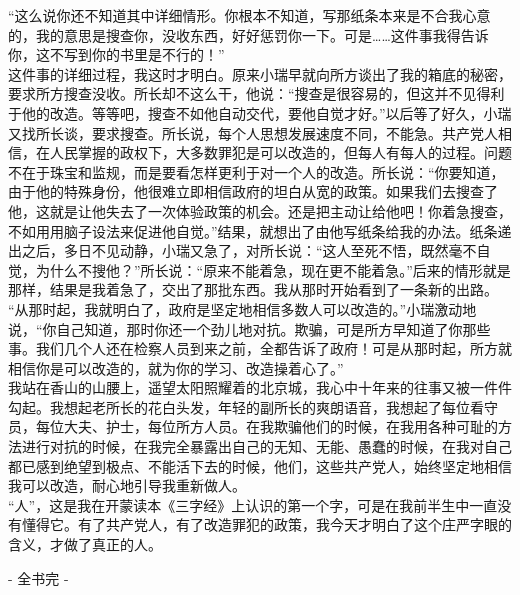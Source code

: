 “这么说你还不知道其中详细情形。你根本不知道，写那纸条本来是不合我心意的，我的意思是搜查你，没收东西，好好惩罚你一下。可是……这件事我得告诉你，这不写到你的书里是不行的！”\\

这件事的详细过程，我这时才明白。原来小瑞早就向所方谈出了我的箱底的秘密，要求所方搜查没收。所长却不这么干，他说：“搜查是很容易的，但这并不见得利于他的改造。等等吧，搜查不如他自动交代，要他自觉才好。”以后等了好久，小瑞又找所长谈，要求搜查。所长说，每个人思想发展速度不同，不能急。共产党人相信，在人民掌握的政权下，大多数罪犯是可以改造的，但每人有每人的过程。问题不在于珠宝和监规，而是要看怎样更利于对一个人的改造。所长说：“你要知道，由于他的特殊身份，他很难立即相信政府的坦白从宽的政策。如果我们去搜查了他，这就是让他失去了一次体验政策的机会。还是把主动让给他吧！你着急搜查，不如用用脑子设法来促进他自觉。”结果，就想出了由他写纸条给我的办法。纸条递出之后，多日不见动静，小瑞又急了，对所长说：“这人至死不悟，既然毫不自觉，为什么不搜他？”所长说：“原来不能着急，现在更不能着急。”后来的情形就是那样，结果是我着急了，交出了那批东西。我从那时开始看到了一条新的出路。\\

“从那时起，我就明白了，政府是坚定地相信多数人可以改造的。”小瑞激动地说，“你自己知道，那时你还一个劲儿地对抗。欺骗，可是所方早知道了你那些事。我们几个人还在检察人员到来之前，全都告诉了政府！可是从那时起，所方就相信你是可以改造的，就为你的学习、改造操着心了。”\\

我站在香山的山腰上，遥望太阳照耀着的北京城，我心中十年来的往事又被一件件勾起。我想起老所长的花白头发，年轻的副所长的爽朗语音，我想起了每位看守员，每位大夫、护士，每位所方人员。在我欺骗他们的时候，在我用各种可耻的方法进行对抗的时候，在我完全暴露出自己的无知、无能、愚蠢的时候，在我对自己都已感到绝望到极点、不能活下去的时候，他们，这些共产党人，始终坚定地相信我可以改造，耐心地引导我重新做人。\\

“人”，这是我在开蒙读本《三字经》上认识的第一个字，可是在我前半生中一直没有懂得它。有了共产党人，有了改造罪犯的政策，我今天才明白了这个庄严字眼的含义，才做了真正的人。\\

\begin{center}
	- 全书完 -
\end{center}
